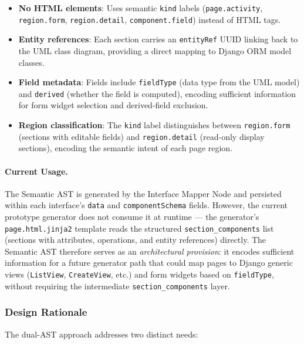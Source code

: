 \begin{itemize}
    \item \textbf{No HTML elements}: Uses semantic \texttt{kind} labels (\texttt{page.activity}, \texttt{region.form}, \texttt{region.detail}, \texttt{component.field}) instead of HTML tags.
    \item \textbf{Entity references}: Each section carries an \texttt{entityRef} UUID linking back to the UML class diagram, providing a direct mapping to Django ORM model classes.
    \item \textbf{Field metadata}: Fields include \texttt{fieldType} (data type from the UML model) and \texttt{derived} (whether the field is computed), encoding sufficient information for form widget selection and derived-field exclusion.
    \item \textbf{Region classification}: The \texttt{kind} label distinguishes between \texttt{region.form} (sections with editable fields) and \texttt{region.detail} (read-only display sections), encoding the semantic intent of each page region.
\end{itemize}

\paragraph{Current Usage.}
The Semantic AST is generated by the Interface Mapper Node and persisted within each interface's \texttt{data} and \texttt{componentSchema} fields. However, the current prototype generator does not consume it at runtime — the generator's \texttt{page.html.jinja2} template reads the structured \texttt{section\_components} list (sections with attributes, operations, and entity references) directly. The Semantic AST therefore serves as an \emph{architectural provision}: it encodes sufficient information for a future generator path that could map pages to Django generic views (\texttt{ListView}, \texttt{CreateView}, etc.) and form widgets based on \texttt{fieldType}, without requiring the intermediate \texttt{section\_components} layer.

\subsubsection{Design Rationale}

The dual-AST approach addresses two distinct needs:

